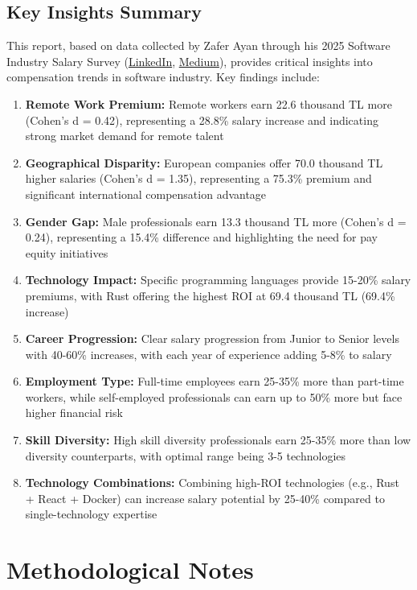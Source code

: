 \documentclass[12pt,a4paper]{article}
\begin{document}
\subsection{Key Insights Summary}
This report, based on data collected by Zafer Ayan through his 2025 Software Industry Salary Survey (\href{https://www.linkedin.com/posts/zaferayan_geleneksel-maa%C5%9F-anketi-buyrun-httpslnkdin-activity-7363866008664629248-7YcQ}{LinkedIn}, \href{https://zaferayan.medium.com/2025-ağustos-detaylı-maaş-anketi-98446d71920a}{Medium}), provides critical insights into compensation trends in software industry. Key findings include:
\begin{enumerate}
    \item \textbf{Remote Work Premium:} Remote workers earn 22.6 thousand TL more (Cohen's d = 0.42), representing a 28.8\% salary increase and indicating strong market demand for remote talent
    \item \textbf{Geographical Disparity:} European companies offer 70.0 thousand TL higher salaries (Cohen's d = 1.35), representing a 75.3\% premium and significant international compensation advantage
    \item \textbf{Gender Gap:} Male professionals earn 13.3 thousand TL more (Cohen's d = 0.24), representing a 15.4\% difference and highlighting the need for pay equity initiatives
    \item \textbf{Technology Impact:} Specific programming languages provide 15-20\% salary premiums, with Rust offering the highest ROI at 69.4 thousand TL (69.4\% increase)
    \item \textbf{Career Progression:} Clear salary progression from Junior to Senior levels with 40-60\% increases, with each year of experience adding 5-8\% to salary
    \item \textbf{Employment Type:} Full-time employees earn 25-35\% more than part-time workers, while self-employed professionals can earn up to 50\% more but face higher financial risk
    \item \textbf{Skill Diversity:} High skill diversity professionals earn 25-35\% more than low diversity counterparts, with optimal range being 3-5 technologies
    \item \textbf{Technology Combinations:} Combining high-ROI technologies (e.g., Rust + React + Docker) can increase salary potential by 25-40\% compared to single-technology expertise
\end{enumerate}

\section{Methodological Notes}
\end{document}
